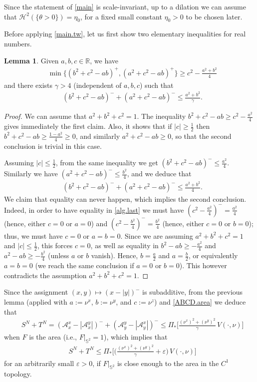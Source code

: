 \documentclass[11pt,a4paper]{amsart}
\newcommand{\R}{\mathbb{R}}
\newcommand{\mz}{\frac{1}{2}}
\theoremstyle{definition}
\newtheorem{lemmaen}[definition]{Lemma}
\newcommand{\A}{\mathcal{A}}
\renewcommand{\epsilon}{\varepsilon}
\begin{document}
Since the statement of \cref{main} is scale-invariant, up to a dilation we can assume that $\mathcal{H}^2(\{\theta>0\})=\eta_0$, for a fixed small constant $\eta_0>0$ to be chosen later.

Before applying \cref{main.tw}, let us first show two elementary inequalities for real numbers.

\begin{lemmaen}
	Given $a,b,c\in\R$, we have
	\begin{align*}
		&\min\{(b^2+c^2-ab)^+,(a^2+c^2-ab)^+\}
		\ge c^2-\frac{a^2+b^2}{4}
	\end{align*}
	and there exists $\gamma>4$ (independent of $a,b,c$) such that
	\begin{align*}
		&(b^2+c^2-ab)^-+(a^2+c^2-ab)^-
		\le\frac{a^2+b^2}{\gamma}.
	\end{align*}
\end{lemmaen}

\begin{proof}
    We can assume that $a^2+b^2+c^2=1$.
	The inequality $b^2+c^2-ab\ge c^2-\frac{a^2}{4}$ gives immediately the first claim.
	Also, it shows that if $|c|\ge\mz$ then $b^2+c^2-ab\ge\frac{1-a^2}{4}\ge 0$, and similarly $a^2+c^2-ab\ge 0$, so that the second conclusion is trivial in this case.
	
	Assuming $|c|\le\mz$, from the same inequality we get $(b^2+c^2-ab)^-\le\frac{a^2}{4}$.
	Similarly we have $(a^2+c^2-ab)^-\le\frac{b^2}{4}$, and we deduce that
	\begin{align}\label{alg.last}
		&(b^2+c^2-ab)^-+(a^2+c^2-ab)^-
		\le\frac{a^2+b^2}{4}.
	\end{align}
	We claim that equality can never happen, which implies the second conclusion.
	Indeed, in order to have equality in \cref{alg.last} we must have $(c^2-\frac{a^2}{4})^-=\frac{a^2}{4}$ (hence, either $c=0$ or $a=0$)
	and $(c^2-\frac{b^2}{4})^-=\frac{b^2}{4}$ (hence, either $c=0$ or $b=0$); thus, we must have $c=0$ or $a=b=0$.
	Since we are assuming $a^2+b^2+c^2=1$ and $|c|\le\mz$, this forces $c=0$, as well as equality in $b^2-ab\ge -\frac{a^2}{4}$ and $a^2-ab\ge -\frac{b^2}{4}$ (unless $a$ or $b$ vanish).
	Hence, $b=\frac{a}{2}$ and $a=\frac{b}{2}$, or equivalently $a=b=0$ (we reach the same conclusion if $a=0$ or $b=0$). This however contradicts the assumption $a^2+b^2+c^2=1$.
\end{proof}

Since the assignment $(x,y)\mapsto (x-|y|)^-$ is subadditive, from the previous lemma (applied with $a:=\nu^x$, $b:=\nu^y$, and $c:=\nu^z$) and \cref{ABCD.area} we deduce that
\begin{align*}
	&S^N+T^N
	=(\A_x^x-|\A_x^y|)^-+(\A_y^y-|\A_y^x|)^-
	\le\Pi_*\Big[\frac{(\nu^x)^2+(\nu^y)^2}{\gamma}\,V(\cdot,\nu)\Big]
\end{align*}
when $F$ is the area (i.e., $F|_{\mathbb{S}^2}=1$), which implies that
\begin{align*}
	&S^N+T^N
	\le\Pi_*\Big[\Big(\frac{(\nu^x)^2+(\nu^y)^2}{\gamma}+\epsilon\Big)\,V(\cdot,\nu)\Big]
\end{align*}
for an arbitrarily small $\epsilon>0$, if $F|_{\mathbb{S}^2}$ is close enough to the area in the $C^1$ topology.
\end{document}
